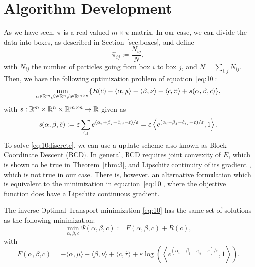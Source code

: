 \section{Algorithm Development}
As we have seen, $\pi$ is a real-valued $m \times n$ matrix. In our case, we can divide the data into boxes, as described in Section~\ref{sec:boxes}, and define
\[ \hat{\pi}_{i j} :=\frac{N_{i j}}{N}, \]
with $N_{i j}$ the number of particles going from box $i$ to box $j$, and $N=\sum_{i, j} N_{i j}$. Then, we have the following optimization problem of equation~\eqref{eq:10}:
\begin{equation}
	\min _{\alpha\in \mathbb{R}^m, \beta\in\mathbb{R}^n, \hat{c}\in\mathbb{R}^{m\times n}}\{R(\hat{c})-\langle\alpha, \mu\rangle-\langle\beta, \nu\rangle+\langle \hat{c}, \hat{\pi}\rangle+s(\alpha, \beta,\hat{c})\} ,
	\label{eq:10discrete}
\end{equation}
with $s: \mathbb{R}^{m} \times \mathbb{R}^{n} \times \mathbb{R}^{m \times n} \rightarrow \mathbb{R}$ given as
\begin{equation}
	s(\alpha, \beta, \hat{c}):=\varepsilon \sum_{i, j} e^{\left(\alpha_{i}+\beta_{j}-\hat{c}_{i j}-\varepsilon\right) / \varepsilon}=\varepsilon\left\langle e^{\left(\alpha_{i}+\beta_{j}-\hat{c}_{i j}-\varepsilon\right) / \varepsilon}, 1\right\rangle .
	\label{eq:s}
\end{equation}
To solve \eqref{eq:10discrete}, we can use a update scheme also known as Block Coordinate Descent (BCD). In general, BCD requires joint convexity of $E$, which is shown to be true in Theorem~\ref{thm:3}, and Lipschitz continuity of its gradient \citep{beck2015}, which is not true in our case. There is, however, an alternative formulation which is equivalent to the minimization in equation~\eqref{eq:10}, where the objective function does have a Lipschitz continuous gradient.
\vspace{0.3cm}
\begin{lemma}
	The inverse Optimal Transport minimization \eqref{eq:10} has the same set of solutions as the following minimization:
	\begin{equation}
		\min _{\alpha, \beta, c} \Psi(\alpha, \beta, c):=F(\alpha, \beta, c)+R(c) ,
		\label{eq:lemma}
	\end{equation}
	with
	\[ F(\alpha, \beta, c)=-\langle\alpha, \mu\rangle-\langle\beta, \nu\rangle+\langle c, \hat{\pi}\rangle+\varepsilon \log \left(\left\langle e^{\left(\alpha_{i}+\beta_{j}-c_{i j}-\varepsilon\right) / \varepsilon}, 1\right\rangle\right) .\]
	\label{lemma:inverseOT}
\end{lemma}
